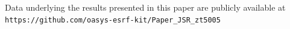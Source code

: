 \documentclass[preprint]{iucr}
\begin{document}







Data underlying the results presented in this paper are publicly available at \newline
\small{\texttt{https://github.com/oasys-esrf-kit/Paper\_JSR\_zt5005}}


\end{document}
